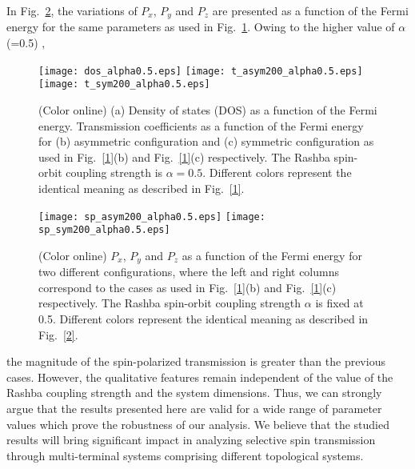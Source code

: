 \documentclass[prb,aps,twocolumn,amsmath,amssymb,floatfix,
superscriptaddress]{revtex4}
\begin{document}
In Fig.~\ref{4}, the variations of $P_x$, $P_y$ and $P_z$ are
presented as a function of the Fermi energy for the same parameters as
used in Fig.~\ref{3}. Owing to the higher value of $\alpha$ (=0.5) ,
\begin{figure}[h]
\hfill
\texttt{[image: dos\_alpha0.5.eps]}\hfill
\texttt{[image: t\_asym200\_alpha0.5.eps]}\hfill
\texttt{[image: t\_sym200\_alpha0.5.eps]}\hfill
\caption{(Color online) (a) Density of states (DOS) as a function of
  the Fermi energy. Transmission coefficients as a function of the
  Fermi energy for (b) asymmetric configuration and (c) symmetric
  configuration as used in Fig.~\ref{1}(b) and Fig.~\ref{1}(c)
  respectively. The Rashba spin-orbit coupling strength is
  $\alpha=0.5$. Different colors represent the identical meaning as
  described in Fig.~\ref{1}.}
\label{3}
\end{figure}
\begin{figure}[h]
\hfill
\texttt{[image: sp\_asym200\_alpha0.5.eps]}\hfill
\texttt{[image: sp\_sym200\_alpha0.5.eps]}\hfill
\caption{(Color online) $P_x$, $P_y$ and $P_z$ as a function of the
  Fermi energy for two different configurations, where the left and right columns correspond to the cases as used in Fig.~\ref{1}(b) and Fig.~\ref{1}(c)
  respectively. The Rashba spin-orbit coupling strength $\alpha$ is fixed at 0.5. Different colors represent the identical meaning as
  described in Fig.~\ref{2}.}
\label{4}
\end{figure}the
magnitude of the spin-polarized transmission is greater than the
previous cases. However, the qualitative features remain independent
of the value of the Rashba coupling strength and the system
dimensions. Thus, we can strongly argue that the results presented
here are valid for a wide range of parameter values which prove the
robustness of our analysis. We believe that the studied results will
bring significant impact in analyzing selective spin transmission
through multi-terminal systems comprising different topological
systems.
\end{document}
